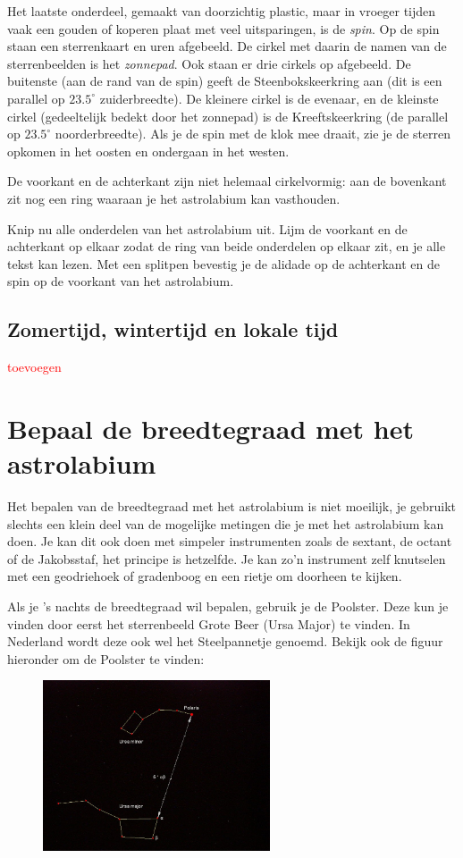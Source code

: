 Het laatste onderdeel, gemaakt van doorzichtig plastic, maar in vroeger tijden vaak een gouden of koperen plaat met veel uitsparingen, is de \textit{spin}. Op de spin staan een sterrenkaart en uren afgebeeld. De cirkel met daarin de namen van de sterrenbeelden is het \textit{zonnepad}. Ook staan er drie cirkels op afgebeeld. De buitenste (aan de rand van de spin) geeft de Steenbokskeerkring aan (dit is een parallel op $23.5^{\circ}$ zuiderbreedte).  De kleinere cirkel is de evenaar, en de kleinste cirkel (gedeeltelijk bedekt door het zonnepad) is de Kreeftskeerkring (de parallel op $23.5^{\circ}$ noorderbreedte). Als je de spin met de klok mee draait, zie je de sterren opkomen in het oosten en ondergaan in het westen.

De voorkant en de achterkant zijn niet helemaal cirkelvormig: aan de bovenkant zit nog een ring waaraan je het astrolabium kan vasthouden.

\begin{opgave}[\schaar]
 Knip nu alle onderdelen van het astrolabium uit. Lijm de voorkant en de achterkant op elkaar zodat de ring van beide onderdelen op elkaar zit, en je alle tekst kan lezen. Met een splitpen bevestig je de alidade op de achterkant en de spin op de voorkant van het astrolabium.
\end{opgave}

\subsection*{Zomertijd, wintertijd en lokale tijd}
\textcolor{red}{toevoegen}

\section{Bepaal de breedtegraad met het astrolabium}
Het bepalen van de breedtegraad met het astrolabium is niet moeilijk, je gebruikt slechts een klein deel van de mogelijke metingen die je met het astrolabium kan doen. Je kan dit ook doen met simpeler instrumenten zoals de sextant, de octant of de Jakobsstaf, het principe is hetzelfde. Je kan zo'n instrument zelf knutselen met een geodriehoek of gradenboog en een rietje om doorheen te kijken.

Als je 's nachts de breedtegraad wil bepalen, gebruik je de Poolster. Deze kun je vinden door eerst het sterrenbeeld Grote Beer (Ursa Major) te vinden. In Nederland wordt deze ook wel het Steelpannetje genoemd. Bekijk ook de figuur hieronder om de Poolster te vinden:
\begin{figure}[h]
\centering
 \includegraphics[width=0.6\textwidth]{Polaris.jpg}
\end{figure}

